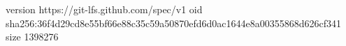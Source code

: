 version https://git-lfs.github.com/spec/v1
oid sha256:36f4d29cd8e55bf66e88c35c59a50870efd6d0ac1644e8a00355868d626cf341
size 1398276
